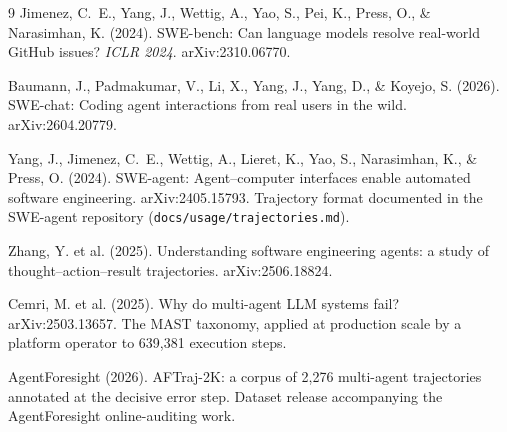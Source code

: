 \documentclass[11pt]{article}
\begin{document}
\begin{thebibliography}{9}
Jimenez, C.~E., Yang, J., Wettig, A., Yao, S., Pei, K., Press, O., \&
Narasimhan, K. (2024).
\newblock SWE-bench: Can language models resolve real-world GitHub issues?
\newblock \emph{ICLR 2024}. arXiv:2310.06770.

Baumann, J., Padmakumar, V., Li, X., Yang, J., Yang, D., \& Koyejo, S.
(2026).
\newblock SWE-chat: Coding agent interactions from real users in the wild.
\newblock arXiv:2604.20779.

Yang, J., Jimenez, C.~E., Wettig, A., Lieret, K., Yao, S., Narasimhan, K.,
\& Press, O. (2024).
\newblock SWE-agent: Agent--computer interfaces enable automated software
engineering.
\newblock arXiv:2405.15793. Trajectory format documented in the SWE-agent
repository (\texttt{docs/usage/trajectories.md}).

Zhang, Y. et al. (2025).
\newblock Understanding software engineering agents: a study of
thought--action--result trajectories.
\newblock arXiv:2506.18824.

Cemri, M. et al. (2025).
\newblock Why do multi-agent LLM systems fail?
\newblock arXiv:2503.13657. The MAST taxonomy, applied at production scale by
a platform operator to 639{,}381 execution steps.

AgentForesight (2026).
\newblock AFTraj-2K: a corpus of 2{,}276 multi-agent trajectories annotated at
the decisive error step.
\newblock Dataset release accompanying the AgentForesight online-auditing
work.
\end{thebibliography}
\end{document}
